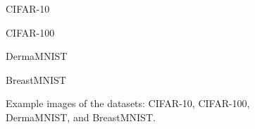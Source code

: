 \documentclass[a4paper]{article}
\begin{document}
\begin{figure}[ht]
  \centering
  \begin{minipage}{0.61\linewidth}
    \parbox[b]{0.2\linewidth}{
      \raggedleft \scriptsize CIFAR-10
    }
  \end{minipage}

  \begin{minipage}{0.615\linewidth}
    \parbox[b]{0.2\linewidth}{
      \raggedleft \scriptsize CIFAR-100
    }
  \end{minipage}
  
  \begin{minipage}{0.6\linewidth}
    \parbox[b]{0.2\linewidth}{
      \raggedleft \scriptsize DermaMNIST
    }
  \end{minipage}
  
  \begin{minipage}{0.615\linewidth}
    \parbox[b]{0.2\linewidth}{
      \raggedleft \scriptsize BreastMNIST
    }
  \end{minipage}

  \caption{Example images of the datasets: CIFAR-10, CIFAR-100, DermaMNIST, and BreastMNIST.}
  \label{fig:combined}
\end{figure}
\end{document}
